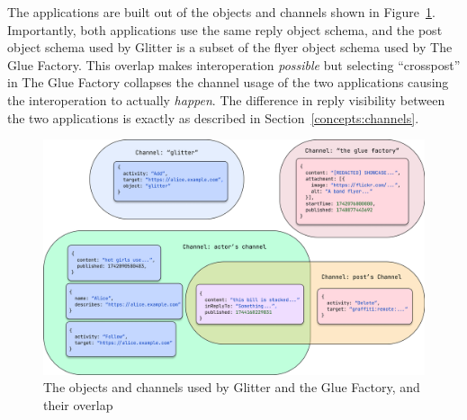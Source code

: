 The applications are built out of the objects and channels
shown in Figure~\ref{case-studies:fig:schemas-and-channels}.
Importantly, both applications use the same reply object schema,
and the post object schema used by Glitter is a subset of the flyer
object schema used by The Glue Factory.
This overlap makes interoperation \emph{possible}
but selecting ``crosspost'' in The Glue Factory collapses the
channel usage of the two applications
causing the interoperation to actually \emph{happen}.
The difference in reply visibility between the two applications
is exactly as described in Section~\ref{concepts:channels}.

\begin{figure}[h]
    \centering
    \includegraphics[width=\textwidth]{figures/schemas-and-channels.png}
    \caption{The objects and channels used by Glitter and the Glue Factory, and their overlap}

    \label{case-studies:fig:schemas-and-channels}
\end{figure}



